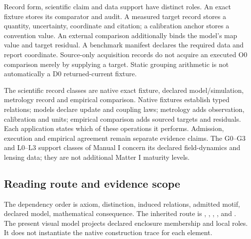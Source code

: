 Record form, scientific claim and data support have distinct roles. An exact
fixture stores its comparator and audit. A measured target record stores a
quantity, uncertainty, coordinate and citation; a calibration anchor stores a
convention value. An external comparison additionally binds the model's map
value and target residual. A benchmark manifest declares the required data and
report coordinate. Source-only acquisition records do not acquire an executed
O0 comparison merely by supplying a target. Static grouping arithmetic is not
automatically a D0 returned-current fixture.

The scientific record classes are native exact fixture, declared
model/simulation, metrology record and empirical comparison. Native fixtures
establish typed relations; models declare update and coupling laws; metrology
adds observation, calibration and units; empirical comparison adds sourced
targets and residuals. Each application states which of these operations it
performs. Admission, execution and empirical agreement remain separate evidence
claims. The G0--G3 and L0--L3 support classes of Manual I concern its declared
field-dynamics and lensing data; they are not additional Matter I maturity levels.


\subsection{Reading route and evidence scope}\label{manual2:reading-route}
The dependency order is axiom, distinction, induced relations, admitted motif, declared model, mathematical consequence. The inherited route is , , , , and . The present visual model projects declared enclosure membership and local roles. It does not instantiate the native construction trace for each element.

